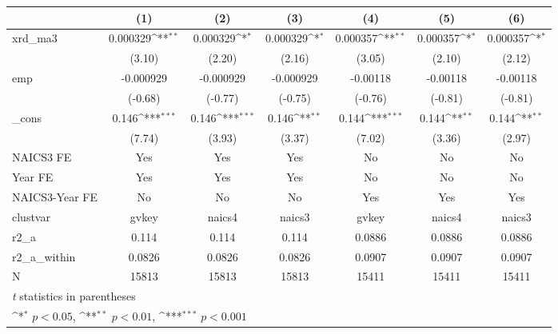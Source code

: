 {
\def\sym#1{\ifmmode^{#1}\else\(^{#1}\)\fi}
\begin{tabular}{l*{6}{c}}
\hline\hline
            &\multicolumn{1}{c}{(1)}         &\multicolumn{1}{c}{(2)}         &\multicolumn{1}{c}{(3)}         &\multicolumn{1}{c}{(4)}         &\multicolumn{1}{c}{(5)}         &\multicolumn{1}{c}{(6)}         \\
\hline
xrd\_ma3     &    0.000329\sym{**} &    0.000329\sym{*}  &    0.000329\sym{*}  &    0.000357\sym{**} &    0.000357\sym{*}  &    0.000357\sym{*}  \\
            &      (3.10)         &      (2.20)         &      (2.16)         &      (3.05)         &      (2.10)         &      (2.12)         \\
[1em]
emp         &   -0.000929         &   -0.000929         &   -0.000929         &    -0.00118         &    -0.00118         &    -0.00118         \\
            &     (-0.68)         &     (-0.77)         &     (-0.75)         &     (-0.76)         &     (-0.81)         &     (-0.81)         \\
[1em]
\_cons      &       0.146\sym{***}&       0.146\sym{***}&       0.146\sym{**} &       0.144\sym{***}&       0.144\sym{**} &       0.144\sym{**} \\
            &      (7.74)         &      (3.93)         &      (3.37)         &      (7.02)         &      (3.36)         &      (2.97)         \\
[1em]
NAICS3 FE   &         Yes         &         Yes         &         Yes         &          No         &          No         &          No         \\
[1em]
Year FE     &         Yes         &         Yes         &         Yes         &          No         &          No         &          No         \\
[1em]
NAICS3-Year FE&          No         &          No         &          No         &         Yes         &         Yes         &         Yes         \\
\hline
clustvar    &       gvkey         &      naics4         &      naics3         &       gvkey         &      naics4         &      naics3         \\
r2\_a        &       0.114         &       0.114         &       0.114         &      0.0886         &      0.0886         &      0.0886         \\
r2\_a\_within &      0.0826         &      0.0826         &      0.0826         &      0.0907         &      0.0907         &      0.0907         \\
N           &       15813         &       15813         &       15813         &       15411         &       15411         &       15411         \\
\hline\hline
\multicolumn{7}{l}{\footnotesize \textit{t} statistics in parentheses}\\
\multicolumn{7}{l}{\footnotesize \sym{*} \(p<0.05\), \sym{**} \(p<0.01\), \sym{***} \(p<0.001\)}\\
\end{tabular}
}
